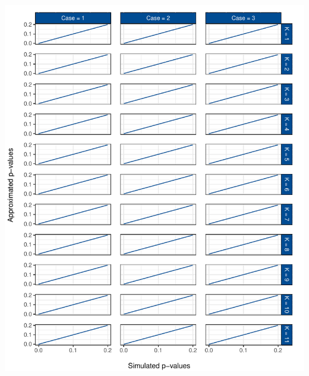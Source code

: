 \documentclass[12pt,a4paper]{article}
\let\origfigure\figure
\let\endorigfigure\endfigure
\renewenvironment{figure}[1][2] {
    \expandafter\origfigure\expandafter[H]
} {
    \endorigfigure
}
\begin{document}
\begin{figure}
\centering
\includegraphics{p_approx_paper_files/figure-latex/approx_sim-all_0.2-1.pdf}
\caption{\label{fig:sim_approx_all_0.2} Simulated vs.~approximated
\(p\)-values for the lower tail of the distribution for all cases and
all underlying test.}
\end{figure}
\end{document}
